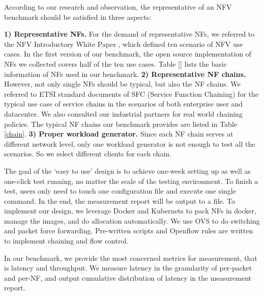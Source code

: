 \documentclass{sig-alternate-10pt}
\begin{document}
According to our research and observation, 
the representative of an NFV benchmark 
should be satisfied in three aspects:

\textbf{1) Representative NFs.}
For the demand of representative NFs, 
we referred to the NFV Introductory White Paper \cite{}, 
which defined ten scenario of NFV use cases. 
In the first version of our benchmark, 
the open source implementation of NFs we collected 
covers half of the ten use cases. 
Table \ref{} lists the basic information of NFs used in our benchmark. 
\textbf{2) Representative NF chains.}
However, not only single NFs should be typical, but also the NF chains. 
We referred to ETSI standard documents of SFC 
(Service Function Chaining) \cite{?????} 
for the typical use case of service chains 
in the scenarios of both enterprise user and datacenter.
We also consulted our industrial partners for real world chaining policies. 
The typical NF chains our benchmark provides are listed in Table \ref{chain}. 
\textbf{3) Proper workload generator.}
Since each NF chain serves at different network level, 
only one workload generator is not enough to test all the scenarios. 
So we select different clients for each chain.

The goal of the `easy to use' design is to 
achieve one-week setting up as well as one-click test running, 
no matter the scale of the testing environment. 
To finish a test, users only need to touch one configuration file 
and execute one single command. 
In the end, the measurement report will be output to a file.
To implement our design, 
we leverage Docker and Kubernets to pack NFs in docker, 
manage the images, and do allocation automatically. 
We use OVS to do switching and packet force forwarding.
Pre-written scripts and Openflow rules are written 
to implement chaining and flow control. 

In our benchmark, we provide the most concerned metrics for measurement, 
that is latency and throughput. 
We measure latency in the granularity of per-packet and per-NF, 
and output cumulative distribution of latency in the measurement report. 
\end{document}
